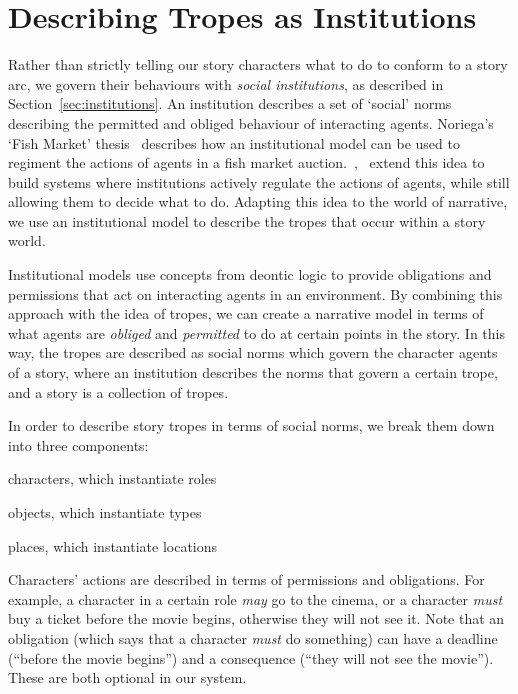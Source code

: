 
\section{Describing Tropes as Institutions} %
\label{sec:tropes-as-insts}
Rather than strictly telling our story characters what to do to conform to a
story arc, we govern their behaviours with \emph{social institutions}, as
described in Section~\ref{sec:institutions}. An institution describes a set of `social' norms describing the permitted and obliged behaviour of interacting agents. Noriega's `Fish Market' thesis~\cite{noriega1999agent} describes how an institutional model can be used to regiment the actions of agents in a fish market auction.~\cite{cliffe2007specifying},~\cite{lee2013decoupling} extend this idea to build systems where institutions actively regulate the actions of agents, while still allowing them to decide what to do. Adapting this idea to the world of narrative, we use an institutional model to describe the tropes that occur within a story world.

Institutional models use concepts from deontic logic to provide obligations and permissions that act on interacting agents in an environment. By combining this approach with the idea of tropes, we can create a narrative model in terms of what agents are \emph{obliged} and \emph{permitted} to do at certain points in the story. In this way, the tropes are described as social norms which govern the character agents of a story, where an institution describes the norms that govern a certain trope, and a story is a collection of tropes.

In order to describe story tropes in terms of social norms, we break them down into three components:

\begin{compactenum}
\item characters, which instantiate roles
\item objects, which instantiate types
\item places, which instantiate locations
\end{compactenum}

Characters' actions are described in terms of permissions and obligations. For example, a character in a certain role \emph{may} go to the cinema, or a character \emph{must} buy a ticket before the movie begins, otherwise they will not see it. Note that an obligation (which says that a character \emph{must} do something) can have a deadline (``before the movie begins'') and a consequence (``they will not see the movie''). These are both optional in our system.

